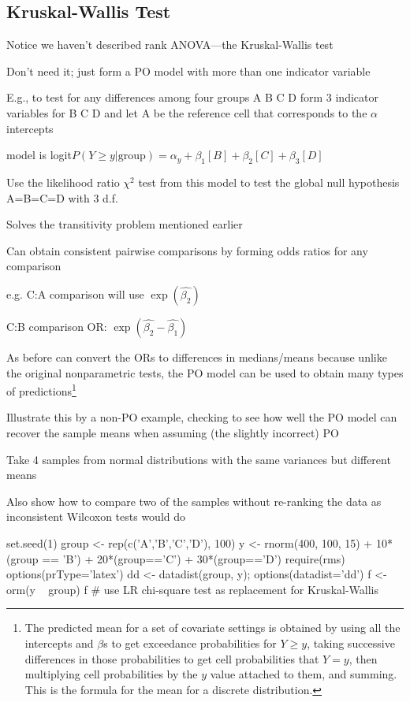 \subsection{Kruskal-Wallis Test}
\bi
\item Notice we haven't described rank ANOVA---the Kruskal-Wallis test
\item Don't need it; just form a PO model with more than one indicator variable
\item E.g., to test for any differences among four groups A B C D form 3 indicator variables for B C D and let A be the reference cell that corresponds to the $\alpha$ intercepts
 \bi
 \item model is logit$P(Y \geq y | \textrm{group}) = \alpha_y + \beta_1 [B] + \beta_2 [C] + \beta_3 [D]$
 \ei
\item Use the likelihood ratio $\chi^2$ test from this model to test the global null hypothesis A=B=C=D with 3 d.f.
\item Solves the transitivity problem mentioned earlier
\item Can obtain consistent pairwise comparisons by forming odds ratios for any comparison
 \bi
 \item e.g. C:A comparison will use $\exp(\hat{\beta_{2}})$
 \item C:B comparison OR: $\exp(\hat{\beta_{2}} - \hat{\beta_{1}})$
 \ei
\item As before can convert the ORs to differences in medians/means because unlike the original nonparametric tests, the PO model can be used to obtain many types of predictions\footnote{The predicted mean for a set of covariate settings is obtained by using all the intercepts and $\beta$s to get exceedance probabilities for $Y \geq y$, taking successive differences in those probabilities to get cell probabilities that $Y=y$, then multiplying cell probabilities by the $y$ value attached to them, and summing.  This is the formula for the mean for a discrete distribution.}
\item Illustrate this by a non-PO example, checking to see how well the PO model can recover the sample means when assuming (the slightly incorrect) PO
\item Take 4 samples from normal distributions with the same variances but different means
\item Also show how to compare two of the samples without re-ranking the data as inconsistent Wilcoxon tests would do
\ei

\begin{Sinput}
set.seed(1)
group <- rep(c('A','B','C','D'), 100)
y <- rnorm(400, 100, 15) + 10*(group == 'B') + 20*(group=='C') + 30*(group=='D')
require(rms)
options(prType='latex')
dd <- datadist(group, y); options(datadist='dd')
f <- orm(y ~ group)
f    # use LR chi-square test as replacement for Kruskal-Wallis
\end{Sinput}

